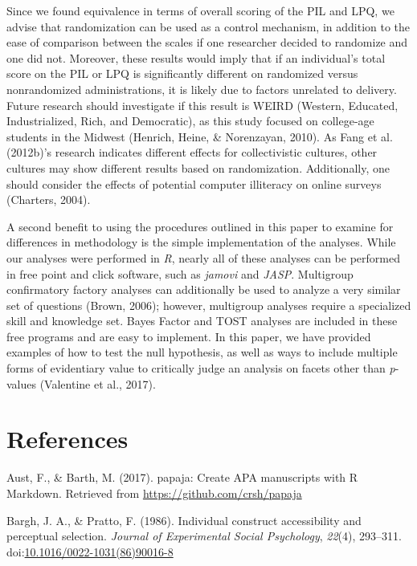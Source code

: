 \documentclass[english,man]{apa6}
\theoremstyle{definition}
\theoremstyle{definition}
\theoremstyle{definition}
\theoremstyle{remark}
\begin{document}
Since we found equivalence in terms of overall scoring of the PIL and
LPQ, we advise that randomization can be used as a control mechanism, in
addition to the ease of comparison between the scales if one researcher
decided to randomize and one did not. Moreover, these results would
imply that if an individual's total score on the PIL or LPQ is
significantly different on randomized versus nonrandomized
administrations, it is likely due to factors unrelated to delivery.
Future research should investigate if this result is WEIRD (Western,
Educated, Industrialized, Rich, and Democratic), as this study focused
on college-age students in the Midwest (Henrich, Heine, \& Norenzayan,
2010). As Fang et al. (2012b)'s research indicates different effects for
collectivistic cultures, other cultures may show different results based
on randomization. Additionally, one should consider the effects of
potential computer illiteracy on online surveys (Charters, 2004).

A second benefit to using the procedures outlined in this paper to
examine for differences in methodology is the simple implementation of
the analyses. While our analyses were performed in \emph{R}, nearly all
of these analyses can be performed in free point and click software,
such as \emph{jamovi} and \emph{JASP}. Multigroup confirmatory factory
analyses can additionally be used to analyze a very similar set of
questions (Brown, 2006); however, multigroup analyses require a
specialized skill and knowledge set. Bayes Factor and TOST analyses are
included in these free programs and are easy to implement. In this
paper, we have provided examples of how to test the null hypothesis, as
well as ways to include multiple forms of evidentiary value to
critically judge an analysis on facets other than \emph{p}-values
(Valentine et al., 2017).

\newpage

\section{References}\label{references}

\setlength{\parindent}{-0.5in} \setlength{\leftskip}{0.5in}

\hypertarget{refs}{}
\hypertarget{ref-Aust2017}{}
Aust, F., \& Barth, M. (2017). papaja: Create APA manuscripts with R
Markdown. Retrieved from \url{https://github.com/crsh/papaja}

\hypertarget{ref-Bargh1986}{}
Bargh, J. A., \& Pratto, F. (1986). Individual construct accessibility
and perceptual selection. \emph{Journal of Experimental Social
Psychology}, \emph{22}(4), 293--311.
doi:\href{https://doi.org/10.1016/0022-1031(86)90016-8}{10.1016/0022-1031(86)90016-8}
\end{document}
